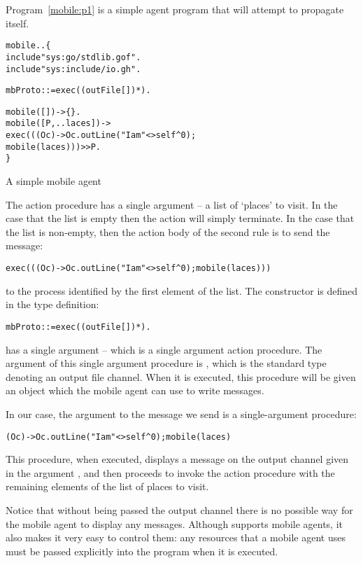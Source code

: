 Program~\vref{mobile:p1} is a simple agent program that will attempt to propagate itself.
\begin{program}
\begin{alltt}
mobile .. \{
  include "sys:go/stdlib.gof".
  include "sys:include/io.gh".

  mbProto ::= exec((outFile[])*).

  mobile([]) -> \{\}.
  mobile([P,..laces]) ->
    exec(((Oc)->Oc.outLine("I am "{}<>self^0);
                mobile(laces)))>>P.
\}
\end{alltt}
\caption{A simple mobile agent\label{mobile:p1}}
\end{program}
The  action procedure has a single argument -- a list of `places' to visit. In the case that the list is empty then the  action will simply terminate. In the case that the list is non-empty, then the action body of the second rule is to send the message:
\begin{alltt}
exec(((Oc)->Oc.outLine("I am "{}<>self^0);mobile(laces)))
\end{alltt}
to the process identified by the first element of the list. The  constructor is defined in the type definition:
\begin{alltt}
mbProto ::= exec((outFile[])*).
\end{alltt}
 has a single argument -- which is a single argument action procedure. The argument of this single argument procedure is , which is the standard type denoting an output file channel. When it is executed, this procedure will be given an object which the mobile agent can use to write messages.

In our case, the argument to the  message we send is a single-argument procedure:
\begin{alltt}
(Oc)->Oc.outLine("I am "{}<>self^0);mobile(laces)
\end{alltt}
This procedure, when executed, displays a message on the output channel given in the argument , and then proceeds to invoke the  action procedure with the remaining elements of the list of places to visit.

Notice that without being passed the output channel there is no possible way for the mobile agent to display any messages. Although \go supports mobile agents, it also makes it very easy to control them: any resources that a mobile agent uses must be passed explicitly into the program when it is executed.

